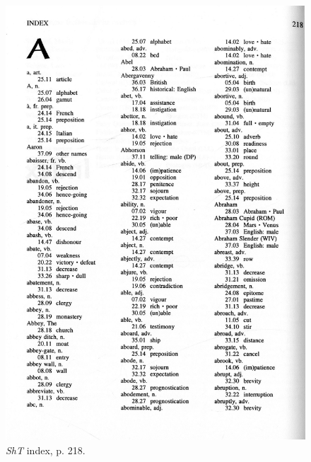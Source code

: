 \begin{figure}[htbp]
  \centering
    \includegraphics[width=\linewidth]{Stolk_thes-content/fig/thes/ShT-p218.jpg}
  \caption{\textit{ShT} index, p. 218.}
  \label{fig:1.A:ShT:index}
\end{figure}


